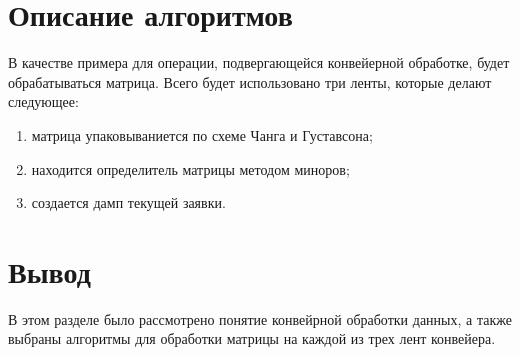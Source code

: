 \section{Описание алгоритмов}

В качестве примера для операции, подвергающейся конвейерной обработке, будет обрабатываться матрица. Всего будет использовано три ленты,
которые делают следующее:
\begin{enumerate}
    \item матрица упаковываниется по схеме Чанга и Густавсона;
    \item находится определитель матрицы методом миноров;
    \item создается дамп текущей заявки.
\end{enumerate}

\section*{Вывод}
В этом разделе было рассмотрено понятие конвейрной обработки данных, а также выбраны алгоритмы для обработки матрицы на каждой из трех лент конвейера.
\clearpage
